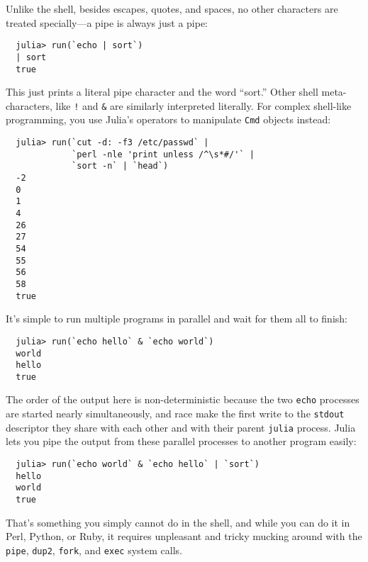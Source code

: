 \documentclass{article}
\begin{document}
Unlike the shell, besides escapes, quotes, and spaces, no other characters are treated specially---a pipe is always just a pipe:
\begin{verbatim}
  julia> run(`echo | sort`)
  | sort
  true
\end{verbatim}
This just prints a literal pipe character and the word ``sort.''
Other shell meta-characters, like \verb|!| and \verb|&| are similarly interpreted literally.
For complex shell-like programming, you use Julia's operators to manipulate \verb|Cmd| objects instead:
\begin{verbatim}
  julia> run(`cut -d: -f3 /etc/passwd` |
             `perl -nle 'print unless /^\s*#/'` |
             `sort -n` | `head`)
  -2
  0
  1
  4
  26
  27
  54
  55
  56
  58
  true
\end{verbatim}
It's simple to run multiple programs in parallel and wait for them all to finish:
\begin{verbatim}
  julia> run(`echo hello` & `echo world`)
  world
  hello
  true
\end{verbatim}
The order of the output here is non-deterministic because the two \verb|echo| processes are started nearly simultaneously, and race make the first write to the \verb|stdout| descriptor they share with each other and with their parent \verb|julia| process.
Julia lets you pipe the output from these parallel processes to another program easily:
\begin{verbatim}
  julia> run(`echo world` & `echo hello` | `sort`)
  hello
  world
  true
\end{verbatim}
That's something you simply cannot do in the shell, and while you can do it in Perl, Python, or Ruby, it requires unpleasant and tricky mucking around with the \verb|pipe|, \verb|dup2|, \verb|fork|, and \verb|exec| system calls.
\end{document}

